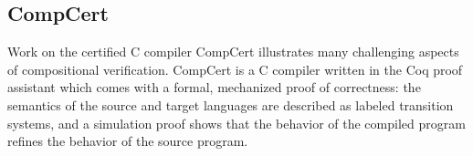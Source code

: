 \documentclass[acmsmall,screen,review,anonymous]{acmart}
\begin{document}





\subsection{CompCert} %

Work on
the certified C compiler CompCert \cite{compcert}
illustrates many challenging aspects of compositional verification.
CompCert is a C compiler written in the Coq proof assistant
which comes with a formal, mechanized proof of correctness:
the semantics of the source and target languages
are described as labeled transition systems,
and a simulation proof
shows that the behavior of the compiled program
refines the behavior of the source program.
\end{document}
